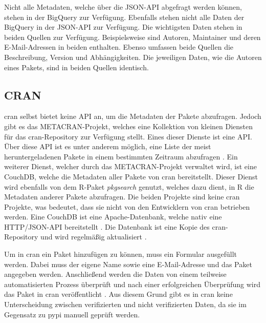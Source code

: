 Nicht alle Metadaten, welche über die JSON-API abgefragt werden können, stehen in der BigQuery zur Verfügung.
Ebenfalls stehen nicht alle Daten der BigQuery in der JSON-API zur Verfügung.
Die wichtigsten Daten stehen in beiden Quellen zur Verfügung.
Beispielsweise sind Autoren, Maintainer und deren E-Mail-Adressen in beiden enthalten.
Ebenso umfassen beide Quellen die Beschreibung, Version und Abhängigkeiten.
Die jeweiligen Daten, wie die Autoren eines Pakets, sind in beiden Quellen identisch.

\subsection{CRAN}
\label{subsec:paketverwaltung_cran}
\gls{cran} selbst bietet keine API an, um die Metadaten der Pakete abzufragen.
Jedoch gibt es das METACRAN-Projekt, welches eine Kollektion von kleinen Diensten für das \gls{cran}-Repository zur Verfügung stellt.
Eines dieser Dienste ist eine API.
Über diese API ist es unter anderem möglich, eine Liste der meist heruntergeladenen Pakete in einem bestimmten Zeitraum abzufragen \autocite{csardi_cranlogsapp_2024}.
Ein weiterer Dienst, welcher durch das METACRAN-Projekt verwaltet wird, ist eine CouchDB, welche die Metadaten aller Pakete von \gls{cran} bereitstellt.
Dieser Dienst wird ebenfalls von dem R-Paket \emph{pkgsearch} genutzt, welches dazu dient, in R die Metadaten anderer Pakete abzufragen.
Die beiden Projekte sind keine \gls{cran} Projekte, was bedeutet, dass sie nicht von den Entwicklern von \gls{cran} betrieben werden.
Eine CouchDB ist eine Apache-Datenbank, welche nativ eine HTTP/JSON-API bereitstellt \autocite{the_apache_software_foundation_apache_2024}.
Die Datenbank ist eine Kopie des \gls{cran}-Repository und wird regelmäßig aktualisiert \autocite{csardi_pkgsearch_2023}.

Um in \gls{cran} ein Paket hinzufügen zu können, muss ein Formular ausgefüllt werden.
Dabei muss der eigene Name sowie eine E-Mail-Adresse und das Paket angegeben werden.
Anschließend werden die Daten von einem teilweise automatisierten Prozess überprüft und nach einer erfolgreichen Überprüfung wird das Paket in \gls{cran} veröffentlicht \autocite{altmann_comprehensive_2024}.
Aus diesem Grund gibt es in \gls{cran} keine Unterscheidung zwischen verifizierten und nicht verifizierten Daten, da sie im Gegensatz zu \gls{pypi} manuell geprüft werden.

